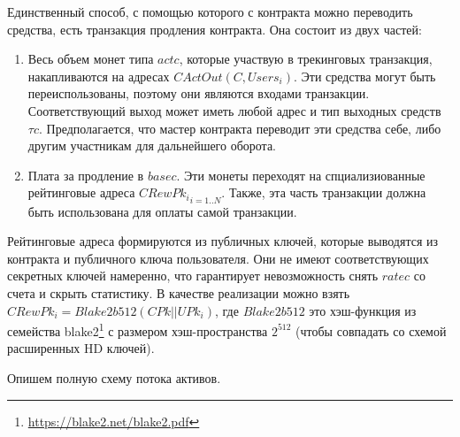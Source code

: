 \documentclass[specification,annotation]{itmo-student-thesis}
\begin{document}
Единственный способ, с помощью которого с контракта можно переводить
средства, есть транзакция продления контракта. Она состоит из двух частей:

\begin{enumerate}
\item Весь объем монет типа $actc$, которые участвую в трекинговых
  транзакция, накапливаются на адресах $CActOut(C,Users_i)$. Эти
  средства могут быть переиспользованы, поэтому они являются входами
  транзакции. Соответствующий выход может иметь любой адрес и тип
  выходных средств $\tau c$. Предполагается, что мастер контракта
  переводит эти средства себе, либо другим участникам для дальнейшего
  оборота.
\item Плата за продление в $basec$. Эти монеты переходят на
  спциализиованные рейтинговые адреса ${CRewPk_i}_{i=1..N}$. Также, эта часть
  транзакции должна быть использована для оплаты самой транзакции.
\end{enumerate}

Рейтинговые адреса формируются из публичных ключей, которые выводятся
из контракта и публичного ключа пользователя. Они не имеют
соответствующих секретных ключей намеренно, что гарантирует
невозможность снять $ratec$ со счета и скрыть статистику. В качестве
реализации можно взять $CRewPk_i = Blake2b512(CPk || UPk_i)$, где
$Blake2b512$ это хэш-функция из семейства
blake2\footnote{\url{https://blake2.net/blake2.pdf}} с размером
хэш-пространства $2^{512}$ (чтобы совпадать со схемой расширенных HD
ключей).

Опишем полную схему потока активов.
\end{document}
